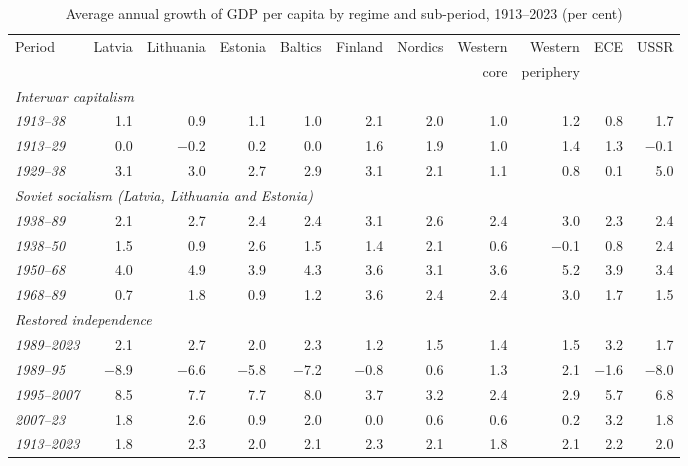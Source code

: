 \begin{table}[htbp]
\centering\scriptsize\setlength{\tabcolsep}{2.5pt}
\caption{Average annual growth of GDP per capita by regime and sub-period, 1913--2023 (per cent)}
\label{tab:growth}
\begin{threeparttable}
\begin{tabular}{lrrrrrrrrrr}
\toprule
Period & Latvia & Lithuania & Estonia & Baltics & Finland & Nordics & Western & Western & ECE & USSR \\
& & & & & & & core & periphery & & \\
\midrule
\multicolumn{11}{l}{\textit{Interwar capitalism}} \\
\textit{1913--38} & 1.1 & 0.9 & 1.1 & 1.0 & 2.1 & 2.0 & 1.0 & 1.2 & 0.8 & 1.7 \\
\textit{1913--29} & 0.0 & $-$0.2 & 0.2 & 0.0 & 1.6 & 1.9 & 1.0 & 1.4 & 1.3 & $-$0.1 \\
\textit{1929--38} & 3.1 & 3.0 & 2.7 & 2.9 & 3.1 & 2.1 & 1.1 & 0.8 & 0.1 & 5.0 \\
\midrule
\multicolumn{11}{l}{\textit{Soviet socialism (Latvia, Lithuania and Estonia)}} \\
\textit{1938--89} & 2.1 & 2.7 & 2.4 & 2.4 & 3.1 & 2.6 & 2.4 & 3.0 & 2.3 & 2.4 \\
\textit{1938--50} & 1.5 & 0.9 & 2.6 & 1.5 & 1.4 & 2.1 & 0.6 & $-$0.1 & 0.8 & 2.4 \\
\textit{1950--68} & 4.0 & 4.9 & 3.9 & 4.3 & 3.6 & 3.1 & 3.6 & 5.2 & 3.9 & 3.4 \\
\textit{1968--89} & 0.7 & 1.8 & 0.9 & 1.2 & 3.6 & 2.4 & 2.4 & 3.0 & 1.7 & 1.5 \\
\midrule
\multicolumn{11}{l}{\textit{Restored independence}} \\
\textit{1989--2023} & 2.1 & 2.7 & 2.0 & 2.3 & 1.2 & 1.5 & 1.4 & 1.5 & 3.2 & 1.7 \\
\textit{1989--95} & $-$8.9 & $-$6.6 & $-$5.8 & $-$7.2 & $-$0.8 & 0.6 & 1.3 & 2.1 & $-$1.6 & $-$8.0 \\
\textit{1995--2007} & 8.5 & 7.7 & 7.7 & 8.0 & 3.7 & 3.2 & 2.4 & 2.9 & 5.7 & 6.8 \\
\textit{2007--23} & 1.8 & 2.6 & 0.9 & 2.0 & 0.0 & 0.6 & 0.6 & 0.2 & 3.2 & 1.8 \\
\midrule
\textit{1913--2023} & 1.8 & 2.3 & 2.0 & 2.1 & 2.3 & 2.1 & 1.8 & 2.1 & 2.2 & 2.0 \\
\bottomrule
\end{tabular}
\begin{tablenotes}
\footnotesize

\end{tablenotes}
\end{threeparttable}
\end{table}
